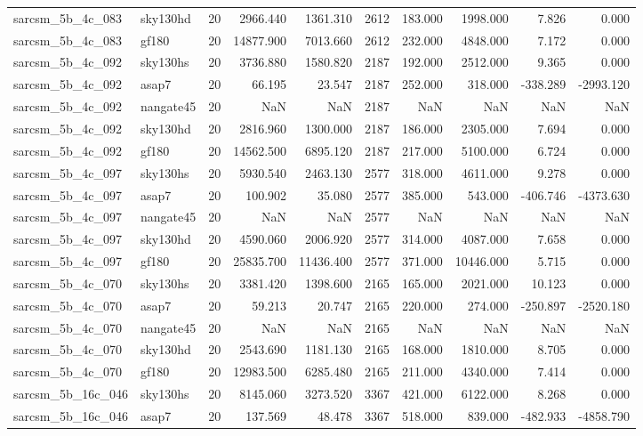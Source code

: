 \documentclass{article}
\begin{document}
\begin{longtable}{llrrrrrrrr}
sarcsm\_5b\_4c\_083 & sky130hd & 20 & 2966.440 & 1361.310 & 2612 & 183.000 & 1998.000 & 7.826 & 0.000 \\
sarcsm\_5b\_4c\_083 & gf180 & 20 & 14877.900 & 7013.660 & 2612 & 232.000 & 4848.000 & 7.172 & 0.000 \\
sarcsm\_5b\_4c\_092 & sky130hs & 20 & 3736.880 & 1580.820 & 2187 & 192.000 & 2512.000 & 9.365 & 0.000 \\
sarcsm\_5b\_4c\_092 & asap7 & 20 & 66.195 & 23.547 & 2187 & 252.000 & 318.000 & -338.289 & -2993.120 \\
sarcsm\_5b\_4c\_092 & nangate45 & 20 & NaN & NaN & 2187 & NaN & NaN & NaN & NaN \\
sarcsm\_5b\_4c\_092 & sky130hd & 20 & 2816.960 & 1300.000 & 2187 & 186.000 & 2305.000 & 7.694 & 0.000 \\
sarcsm\_5b\_4c\_092 & gf180 & 20 & 14562.500 & 6895.120 & 2187 & 217.000 & 5100.000 & 6.724 & 0.000 \\
sarcsm\_5b\_4c\_097 & sky130hs & 20 & 5930.540 & 2463.130 & 2577 & 318.000 & 4611.000 & 9.278 & 0.000 \\
sarcsm\_5b\_4c\_097 & asap7 & 20 & 100.902 & 35.080 & 2577 & 385.000 & 543.000 & -406.746 & -4373.630 \\
sarcsm\_5b\_4c\_097 & nangate45 & 20 & NaN & NaN & 2577 & NaN & NaN & NaN & NaN \\
sarcsm\_5b\_4c\_097 & sky130hd & 20 & 4590.060 & 2006.920 & 2577 & 314.000 & 4087.000 & 7.658 & 0.000 \\
sarcsm\_5b\_4c\_097 & gf180 & 20 & 25835.700 & 11436.400 & 2577 & 371.000 & 10446.000 & 5.715 & 0.000 \\
sarcsm\_5b\_4c\_070 & sky130hs & 20 & 3381.420 & 1398.600 & 2165 & 165.000 & 2021.000 & 10.123 & 0.000 \\
sarcsm\_5b\_4c\_070 & asap7 & 20 & 59.213 & 20.747 & 2165 & 220.000 & 274.000 & -250.897 & -2520.180 \\
sarcsm\_5b\_4c\_070 & nangate45 & 20 & NaN & NaN & 2165 & NaN & NaN & NaN & NaN \\
sarcsm\_5b\_4c\_070 & sky130hd & 20 & 2543.690 & 1181.130 & 2165 & 168.000 & 1810.000 & 8.705 & 0.000 \\
sarcsm\_5b\_4c\_070 & gf180 & 20 & 12983.500 & 6285.480 & 2165 & 211.000 & 4340.000 & 7.414 & 0.000 \\
sarcsm\_5b\_16c\_046 & sky130hs & 20 & 8145.060 & 3273.520 & 3367 & 421.000 & 6122.000 & 8.268 & 0.000 \\
sarcsm\_5b\_16c\_046 & asap7 & 20 & 137.569 & 48.478 & 3367 & 518.000 & 839.000 & -482.933 & -4858.790 \\

\end{longtable}
\end{document}
